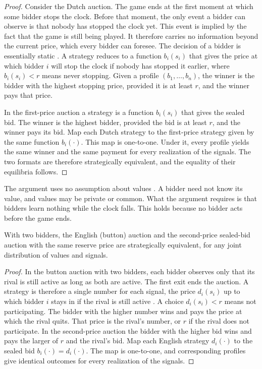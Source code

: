 \begin{proof}
Consider the Dutch auction. The game ends at the first moment at which some bidder stops the clock. Before
that moment, the only event a bidder can observe is that nobody has stopped the clock yet. This event is
implied by the fact that the game is still being played. It therefore carries no information beyond the
current price, which every bidder can foresee. The decision of a bidder is essentially static
\citep[p.~1091]{MilgromWeber1982}. A strategy reduces to a function $b_i(s_i)$ that gives the price at which
bidder $i$ will stop the clock if nobody has stopped it earlier, where $b_i(s_i)<r$ means never stopping.
Given a profile $(b_1,\dots,b_n)$, the winner is the bidder with the highest stopping price, provided it is
at least $r$, and the winner pays that price.

In the first-price auction a strategy is a function $b_i(s_i)$ that gives the sealed bid. The winner is the
highest bidder, provided the bid is at least $r$, and the winner pays its bid. Map each Dutch strategy to
the first-price strategy given by the same function $b_i(\cdot)$. This map is one-to-one. Under it, every
profile yields the same winner and the same payment for every realization of the signals. The two formats
are therefore strategically equivalent, and the equality of their equilibria follows.
\end{proof}

\begin{remark}
The argument uses no assumption about values \citep[footnote~11]{MilgromWeber1982}. A bidder need not know
its value, and values may be private or common. What the argument requires is that bidders learn nothing
while the clock falls. This holds because no bidder acts before the game ends.
\end{remark}

\begin{proposition}\label{prop:14-english-spa-n2}
With two bidders, the English (button) auction and the second-price sealed-bid auction with the same
reserve price are strategically equivalent, for any joint distribution of values and signals.
\end{proposition}

\begin{proof}
In the button auction with two bidders, each bidder observes only that its rival is still active as long as
both are active. The first exit ends the auction. A strategy is therefore a single number for each signal,
the price $d_i(s_i)$ up to which bidder $i$ stays in if the rival is still active
\citep[p.~1104]{MilgromWeber1982}. A choice $d_i(s_i)<r$ means not participating. The bidder with the higher
number wins and pays the price at which the rival quits. That price is the rival's number, or $r$ if the
rival does not participate. In the second-price auction the bidder with the higher bid wins and pays the
larger of $r$ and the rival's bid. Map each English strategy $d_i(\cdot)$ to the sealed bid
$b_i(\cdot)=d_i(\cdot)$. The map is one-to-one, and corresponding profiles give identical outcomes for every
realization of the signals.
\end{proof}

